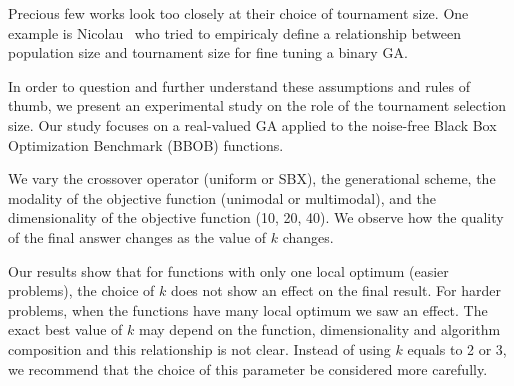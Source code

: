 
Precious few works look too closely at their choice of tournament
size. One example is Nicolau~\cite{nicolau2009application} who tried
to empiricaly define a relationship between population size and
tournament size for fine tuning a binary GA.

In order to question and further understand these assumptions and
rules of thumb, we present an experimental study on the role of the
tournament selection size. Our study focuses on a real-valued GA
applied to the noise-free Black Box Optimization Benchmark (BBOB)
functions.

We vary the crossover operator (uniform or SBX), the generational
scheme, the modality of the objective function (unimodal or
multimodal), and the dimensionality of the objective function (10, 20,
40).  We observe how the quality of the final answer changes as the
value of $k$ changes.

Our results show that for functions with only one local optimum
(easier problems), the choice of $k$ does not show an effect on the
final result. For harder problems, when the functions have many local
optimum we saw an effect. The exact best value of $k$ may depend on
the function, dimensionality and algorithm composition and this
relationship is not clear. Instead of using $k$ equals to 2 or 3, we
recommend that the choice of this parameter be considered more
carefully.
